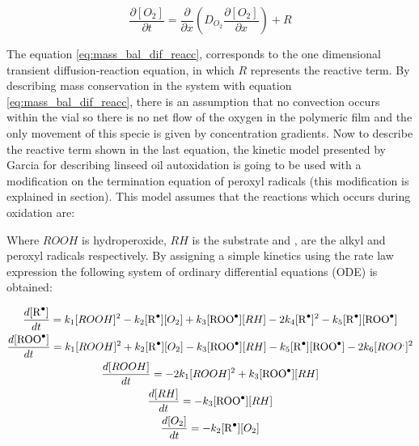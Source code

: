 \begin{refsection}
\begin{equation}
    \frac{\partial [O_2]}{\partial t}= \frac{\partial}{\partial x} \left(D_{O_2}\frac{\partial [O_2] }{\partial x}\right)+ R
    \label{eq:mass_bal_dif_reacc}
\end{equation}

The equation \ref{eq:mass_bal_dif_reacc}, corresponds to the one dimensional transient diffusion-reaction equation, in which $R$ represents the reactive term. By describing mass conservation in the system with equation \ref{eq:mass_bal_dif_reacc}, there is an assumption that no convection occurs within the vial so there is no net flow of the oxygen in the polymeric film and the only movement of this specie is given by concentration gradients. Now to describe the reactive term shown in the last equation, the kinetic model presented by Garcia \cite{GarciaMora2015KineticScavengers} for describing linseed oil autoxidation is going to be used with a modification on the termination equation of peroxyl radicals (this modification is explained in section). This model assumes that the reactions which occurs during oxidation are:


Where $ROOH$ is hydroperoxide, $RH$ is the substrate and ,  are the alkyl and peroxyl radicals respectively. By assigning a simple kinetics using the rate law expression the following system of ordinary differential equations (ODE) is obtained:

\begin{gather}
    \frac{d[\ce{R^.}]}{dt}= k_1[ROOH]^2 - k_2 [\ce{R^.}][O_2]+ k_3[\ce{ROO^.}][RH]-2k_4[\ce{R^.}]^2 -k_5[\ce{R^.}][\ce{ROO^.}]\label{eq:consum_R.}\\
    \frac{d[\ce{ROO^.}]}{dt}= k_1[ROOH]^2 + k_2 [\ce{R^.}][O_2]- k_3[\ce{ROO^.}][RH]-k_5[\ce{R^.}][\ce{ROO^.}]-2k_6 [ROO^.]^2\\
   \frac{d[ROOH]}{dt}= -2k_1[ROOH]^2 + k_3[\ce{ROO^.}][RH]\\
   \frac{d[RH]}{dt}=-k_3[\ce{ROO^.}][RH]\label{eq:consum_RH}\\
   \frac{d[O_2]}{dt}= -k_2[\ce{R^.}][O_2]\label{eq:consum_O2}
\end{gather}


\end{refsection}
